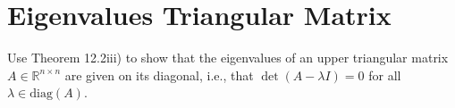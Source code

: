 \section{Eigenvalues Triangular Matrix}
Use Theorem 12.2iii) to show that the eigenvalues of an upper triangular matrix $A \in \mathbb{R}^{n \times n}$ are given on its diagonal, i.e., that 
$\det (A - \lambda I)=0$ for all $\lambda \in \textrm{diag}(A)$.